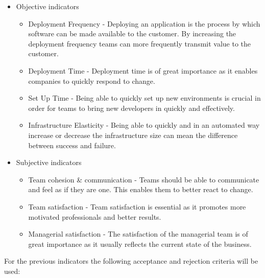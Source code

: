 	\begin{itemize}
        \item{ Objective indicators }
        	\begin{itemize}
				\item{Deployment Frequency} - Deploying an application is the process by which software can be made available to the customer. By increasing the deployment frequency teams can more frequently transmit value to the customer. 
                
				\item{Deployment Time} - Deployment time is of great importance as it enables companies to quickly respond to change. 
                
				\item{Set Up Time} - Being able to quickly set up new environments is crucial in order for teams to bring new developers in quickly and effectively.

				\item{Infrastructure Elasticity} - Being able to quickly and in an automated way increase or decrease the infrastructure size can mean the difference between success and failure. 

			\end{itemize}
            
            
        \item{ Subjective indicators }
        	\begin{itemize}

        		\item{Team cohesion \& communication} - Teams should be able to communicate and feel as if they are one. This enables them to better react to change.

				\item{Team satisfaction} - Team satisfaction is essential as it promotes more motivated professionals and better results. 
                
				\item{ Managerial satisfaction } - The satisfaction of the managerial team is of great importance as it usually reflects the current state of the business. 
                
			\end{itemize}

	\end{itemize}
	\pagebreak
	For the previous indicators the following acceptance and rejection criteria will be used: 
    

